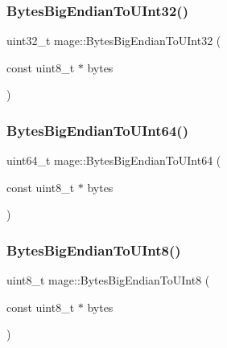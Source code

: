 \subsubsection{\texorpdfstring{Bytes\+Big\+Endian\+To\+U\+Int32()}{BytesBigEndianToUInt32()}}
{\footnotesize\ttfamily uint32\+\_\+t mage\+::\+Bytes\+Big\+Endian\+To\+U\+Int32 (\begin{DoxyParamCaption}\item[{const uint8\+\_\+t $\ast$}]{bytes }\end{DoxyParamCaption})}

\hypertarget{namespacemage_a7509f9c1a6cf98056f2deaa8a2f45c7c}{}\label{namespacemage_a7509f9c1a6cf98056f2deaa8a2f45c7c} 
\subsubsection{\texorpdfstring{Bytes\+Big\+Endian\+To\+U\+Int64()}{BytesBigEndianToUInt64()}}
{\footnotesize\ttfamily uint64\+\_\+t mage\+::\+Bytes\+Big\+Endian\+To\+U\+Int64 (\begin{DoxyParamCaption}\item[{const uint8\+\_\+t $\ast$}]{bytes }\end{DoxyParamCaption})}

\hypertarget{namespacemage_a89be63c40055cf211d63423bb25be1cc}{}\label{namespacemage_a89be63c40055cf211d63423bb25be1cc} 
\subsubsection{\texorpdfstring{Bytes\+Big\+Endian\+To\+U\+Int8()}{BytesBigEndianToUInt8()}}
{\footnotesize\ttfamily uint8\+\_\+t mage\+::\+Bytes\+Big\+Endian\+To\+U\+Int8 (\begin{DoxyParamCaption}\item[{const uint8\+\_\+t $\ast$}]{bytes }\end{DoxyParamCaption})}

\hypertarget{namespacemage_a5f6d31e3bcd9b047c2dfe8fa90d4092d}{}\label{namespacemage_a5f6d31e3bcd9b047c2dfe8fa90d4092d} 
